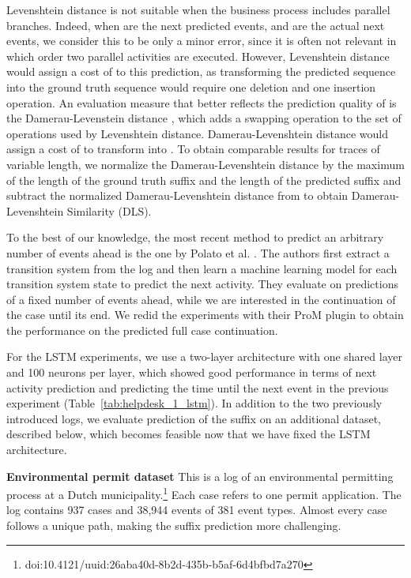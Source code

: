 \documentclass[runningheads,a4paper]{llncs}
\begin{document}
Levenshtein distance is not suitable when the business process includes parallel branches. Indeed, when  are the next predicted events, and  are the actual next events, we consider this to be only a minor error, since it is often not relevant in which order two parallel activities are executed. However, Levenshtein distance would assign a cost of  to this prediction, as transforming the predicted sequence into the ground truth sequence would require one deletion and one insertion operation. An evaluation measure that better reflects the prediction quality of is the Damerau-Levenstein distance \cite{Damerau1964}, which adds a swapping operation to the set of operations used by Levenshtein distance. Damerau-Levenshtein distance would assign a cost of  to transform  into . To obtain comparable results for traces of variable length, we normalize the Damerau-Levenshtein distance by the maximum of the length of the ground truth suffix and the length of the predicted suffix and subtract the normalized Damerau-Levenshtein distance from  to obtain Damerau-Levenshtein Similarity (DLS).

To the best of our knowledge, the most recent method to predict an arbitrary number of events ahead is the one by Polato et al. \cite{Polato2016}. The authors first extract a transition system from the log and then learn a machine learning model for each transition system state to predict the next activity. They evaluate on predictions of a fixed number of events ahead, while we are interested in the continuation of the case until its end. We redid the experiments with their ProM plugin to obtain the performance on the predicted full case continuation.

For the LSTM experiments, we use a two-layer architecture with one shared layer and 100 neurons per layer, which showed good performance in terms of next activity prediction and predicting the time until the next event in the previous experiment (Table~\ref{tab:helpdesk_1_lstm}). In addition to the two previously introduced logs, we evaluate prediction of the suffix on an additional dataset, described below, which becomes feasible now that we have fixed the LSTM architecture. 

\medskip\noindent\textbf{Environmental permit dataset}
This is a log of an environmental permitting process at a Dutch municipality.\footnote{doi:10.4121/uuid:26aba40d-8b2d-435b-b5af-6d4bfbd7a270} Each case refers to one permit application. The log contains 937 cases and 38,944 events of 381 event types. Almost every case follows a unique path, making the suffix prediction more challenging.
\end{document}
